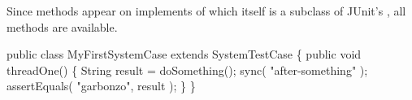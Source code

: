 Since  methods appear on implements
of  which itself is a subclass of
JUnit's , all  methods
are available.

\begin{codelisting}
public class MyFirstSystemCase
    extends SystemTestCase
\{
    public void threadOne()
    \{
        String result = doSomething();
        sync( "after-something" );
        assertEquals( "garbonzo",
                      result );
    \}
\}
\end{codelisting}

